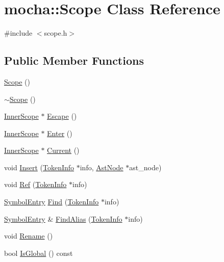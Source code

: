 \hypertarget{classmocha_1_1_scope}{
\section{mocha::Scope Class Reference}
\label{classmocha_1_1_scope}
}


{\ttfamily \#include $<$scope.h$>$}

\subsection*{Public Member Functions}
\begin{DoxyCompactItemize}
\item 
\hyperlink{classmocha_1_1_scope_a1285a61d062405ac9292384fc6745065}{Scope} ()
\item 
\hyperlink{classmocha_1_1_scope_a231d9af8b87a3ad8e5cb67282a295fae}{$\sim$Scope} ()
\item 
\hyperlink{classmocha_1_1_inner_scope}{InnerScope} $\ast$ \hyperlink{classmocha_1_1_scope_a705410a49c99211aec6c02c5d2487e03}{Escape} ()
\item 
\hyperlink{classmocha_1_1_inner_scope}{InnerScope} $\ast$ \hyperlink{classmocha_1_1_scope_a29ece19b67b1fe0e342972d88b0240cf}{Enter} ()
\item 
\hyperlink{classmocha_1_1_inner_scope}{InnerScope} $\ast$ \hyperlink{classmocha_1_1_scope_acdc8929125b135da654301a563337d02}{Current} ()
\item 
void \hyperlink{classmocha_1_1_scope_a05d3d516b51f3f5f77d5be59124a3a60}{Insert} (\hyperlink{classmocha_1_1_token_info}{TokenInfo} $\ast$info, \hyperlink{classmocha_1_1_ast_node}{AstNode} $\ast$ast\_\-node)
\item 
void \hyperlink{classmocha_1_1_scope_ac9bde607294112095398a58f038d6e5f}{Ref} (\hyperlink{classmocha_1_1_token_info}{TokenInfo} $\ast$info)
\item 
\hyperlink{namespacemocha_a692c3ca38973da32760e114599b8a960}{SymbolEntry} \hyperlink{classmocha_1_1_scope_a81cb8dcf31eb20e25c70de74cfd37b57}{Find} (\hyperlink{classmocha_1_1_token_info}{TokenInfo} $\ast$info)
\item 
\hyperlink{namespacemocha_a692c3ca38973da32760e114599b8a960}{SymbolEntry} \& \hyperlink{classmocha_1_1_scope_a366485d8c7ded9537966abfd04f37804}{FindAlias} (\hyperlink{classmocha_1_1_token_info}{TokenInfo} $\ast$info)
\item 
void \hyperlink{classmocha_1_1_scope_a5d02cf07dfb63b4deee6ac4ed710a11c}{Rename} ()
\item 
bool \hyperlink{classmocha_1_1_scope_a340ac275b3d9ecb0baf943136eb95ebc}{IsGlobal} () const 
\end{DoxyCompactItemize}
